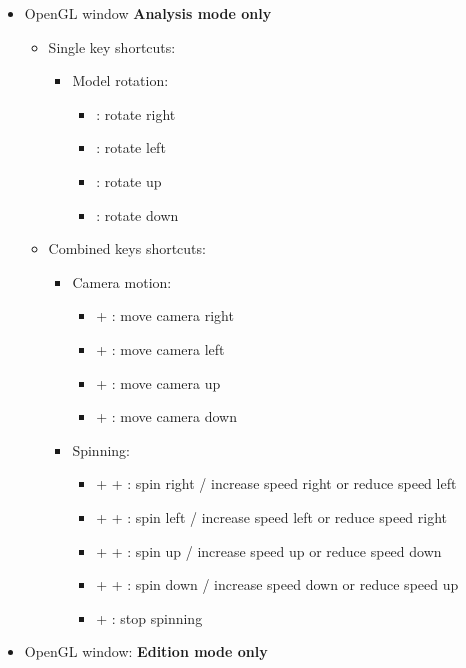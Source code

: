 {\begin{itemize}
\begin{itemize}
\begin{itemize}
\begin{itemize}
\item[] \Shift + \UArrow : zoom out
\item[] \Shift + \DArrow : zoom in
\end{itemize}
\end{itemize}
\end{itemize}
\item OpenGL window {\bf{Analysis mode only}}
\begin{itemize}
\item Single key shortcuts: 
\begin{itemize}
\item Model rotation: 
\begin{itemize}
\item[] \RArrow : rotate right
\item[] \LArrow : rotate left
\item[] \UArrow : rotate up
\item[] \DArrow : rotate down 
\end{itemize}
\end{itemize}
\item Combined keys shortcuts: 
\begin{itemize}
\item Camera motion: 
\begin{itemize}
\item[] \Ctrl + \RArrow : move camera right
\item[] \Ctrl + \LArrow : move camera left
\item[] \Ctrl + \UArrow : move camera up
\item[] \Ctrl + \DArrow : move camera down 
\end{itemize}
\item Spinning: 
\begin{itemize}
\item[] \Ctrl + \Shift + \RArrow : spin right / increase speed right or reduce speed left
\item[] \Ctrl + \Shift + \RArrow : spin left / increase speed left or reduce speed right
\item[] \Ctrl + \Shift + \UArrow : spin up / increase speed up or reduce speed down
\item[] \Ctrl + \Shift + \DArrow : spin down / increase speed down or reduce speed up 
\item[] \Ctrl +  : stop spinning 
\end{itemize}
\end{itemize}
\end{itemize}
\item OpenGL window: {\bf{Edition mode only}}

\end{itemize}}
